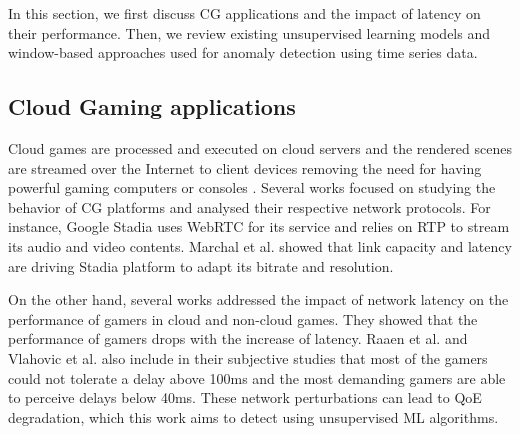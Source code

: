 In this section, we first discuss CG applications and the impact of latency on their performance. Then, we review existing unsupervised learning models and window-based approaches used for anomaly detection using time series data.
\subsection{Cloud Gaming applications}
Cloud games are processed and executed on cloud servers and the rendered scenes are streamed over the Internet to client devices removing the need for having powerful gaming computers or consoles \cite{Cai2016ASO}. Several works \cite{marchal2023analysis, Iqbal2021DissectingCG, Domenico2021ANA} focused on studying the behavior of CG platforms and analysed their respective network protocols. For instance, Google Stadia uses WebRTC for its service and relies on RTP to stream its audio and video contents. Marchal et al. \cite{marchal2023analysis} showed that link capacity and latency are driving Stadia platform to adapt its bitrate and resolution.

On the other hand, several works \cite{Claypool2014TheEO,Raaen2014CanGD, Eg2018PlayingWD, Vlahovic2019TheIO} addressed the impact of network latency on the performance of gamers in cloud and non-cloud games. They showed that the performance of gamers drops with the increase of latency. Raaen et al. \cite{Raaen2014CanGD} and Vlahovic et al. \cite{Vlahovic2019TheIO} also include in their subjective studies that most of the gamers could not tolerate a delay above 100ms and the most demanding gamers are able to perceive delays below 40ms. These network perturbations can lead to QoE degradation, which this work aims to detect using unsupervised ML algorithms.

